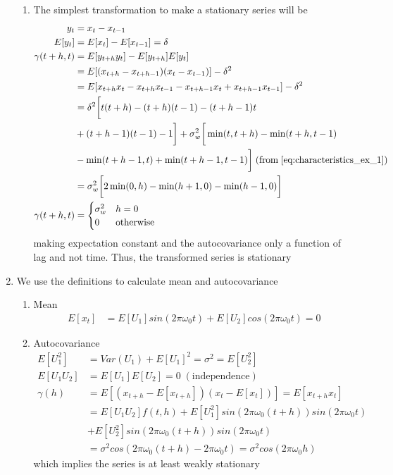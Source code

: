 \documentclass[../../time_series_notes.tex]{subfiles}
\begin{document}
\begin{enumerate}
\begin{enumerate}
        \item The simplest transformation to make a stationary series will be
        \begin{align*}
            y_{t} &= x_{t} - x_{t-1}\\
            E[y_{t}] &= E[x_{t}] - E[x_{t-1}] = \delta\\
            \gamma(t+h,t) &= E[y_{t+h}y_{t}] - E[y_{t+h}]E[y_{t}]\\
            &= E[(x_{t+h} - x_{t+h-1})(x_{t} - x_{t-1})] - \delta^{2}\\
            &= E[x_{t+h}x_{t} - x_{t+h}x_{t-1} - x_{t+h-1}x_{t} + x_{t+h-1}x_{t-1}] - \delta^{2}\\
            &= \delta^{2} \bigg [ t(t+h) - (t+h)(t-1) - (t+h-1)t \\&+ (t+h-1)(t-1) - 1 \bigg] + \sigma_{w}^{2} \bigg[\min(t,t+h) - \min(t+h,t-1) \\&- \min(t+h-1,t) + \min(t+h-1,t-1) \bigg] \;(\text{from}\; \eqref{eq:characteristics_ex_1}) \\
            &= \sigma_{w}^{2} \bigg[2\min(0,h) - \min(h+1,0) - \min(h-1,0) \bigg]\\
            \gamma(t+h,t) &= \begin{cases} \sigma_{w}^{2} &\mbox{$h = 0$}\\
            0 &\mbox{otherwise} \end{cases}
        \end{align*}
        making expectation constant and the autocovariance only a function of lag and not time. Thus, the transformed series is stationary
    \end{enumerate}

    \item We use the definitions to calculate mean and autocovariance
    \begin{enumerate}
        \item Mean
        \begin{align*}
            E[x_{t}] &= E[U_{1}] sin(2\pi \omega_{0}t) + E[U_{2}] cos(2\pi \omega_{0}t)= 0
        \end{align*}

        \item Autocovariance
        \begin{align*}
            E[U_{1}^{2}] &= Var(U_{1}) + E[U_{1}]^{2} = \sigma^{2} = E[U_{2}^{2}]\\
            E[U_{1}U_{2}] &= E[U_{1}]E[U_{2}] = 0 \; (\text{independence})\\
            \gamma(h) &= E[(x_{t+h} - E[x_{t+h}])(x_{t} - E[x_{t}])] = E[x_{t+h}x_{t}]\\
            &= E[U_{1}U_{2}]f(t,h) + E[U_{1}^{2}]sin(2\pi\omega_{0}(t+h))sin(2\pi\omega_{0}t) \\&+ E[U_{2}^{2}]sin(2\pi\omega_{0}(t+h))sin(2\pi\omega_{0}t)\\
            &= \sigma^{2}cos(2\pi\omega_{0}(t+h) - 2\pi\omega_{0}t) = \sigma^{2}cos(2\pi\omega_{0}h)
        \end{align*}
        which implies the series is at least weakly stationary
    \end{enumerate}
\end{enumerate}
\end{document}
